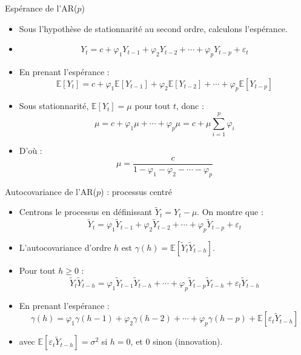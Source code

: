 \documentclass[11pt,aspectratio=169]{beamer}
\newcommand{\E}{\mathbb{E}}
\begin{document}
\begin{frame}{Espérance de l'AR($p$)}

\begin{itemize}

\item Sous l'hypothèse de stationnarité au second ordre, calculons l'espérance.\newline

\item \[
Y_t = c + \varphi_1 Y_{t-1} + \varphi_2 Y_{t-2} + \cdots + \varphi_p Y_{t-p} + \varepsilon_t
\]

\item En prenant l'espérance :
\[
\E[Y_t] = c + \varphi_1 \E[Y_{t-1}] + \varphi_2 \E[Y_{t-2}] + \cdots + \varphi_p \E[Y_{t-p}]
\]

\item Sous stationnarité, $\E[Y_t] = \mu$ pour tout $t$, donc :
\[
\mu = c + \varphi_1 \mu + \cdots + \varphi_p \mu = c + \mu \sum_{i=1}^{p} \varphi_i
\]

\item D'où :
\[
\boxed{\mu = \frac{c}{1 - \varphi_1 - \varphi_2 - \cdots - \varphi_p}}
\]

\end{itemize}
\end{frame}

\begin{frame}{Autocovariance de l'AR($p$) : processus centré}

\begin{itemize}

\item Centrons le processus en définissant $\tilde{Y}_t = Y_t - \mu$. On montre que :
\[
\tilde{Y}_t = \varphi_1 \tilde{Y}_{t-1} + \varphi_2 \tilde{Y}_{t-2} + \cdots + \varphi_p \tilde{Y}_{t-p} + \varepsilon_t
\]

\item L'autocovariance d'ordre $h$ est $\gamma(h) = \E[\tilde{Y}_t \tilde{Y}_{t-h}]$.\newline

\item Pour tout $h \geq 0$ :
\[
\tilde{Y}_t \tilde{Y}_{t-h} = \varphi_1 \tilde{Y}_{t-1} \tilde{Y}_{t-h} + \cdots + \varphi_p \tilde{Y}_{t-p} \tilde{Y}_{t-h} + \varepsilon_t \tilde{Y}_{t-h}
\]

\item En prenant l'espérance :
\[
\gamma(h) = \varphi_1 \gamma(h-1) + \varphi_2 \gamma(h-2) + \cdots + \varphi_p \gamma(h-p) + \E[\varepsilon_t \tilde{Y}_{t-h}]
\]

\item avec $\E[\varepsilon_t \tilde{Y}_{t-h}] = \sigma^2$ si $h = 0$, et $0$ sinon (innovation).

\end{itemize}
\end{frame}
\end{document}
